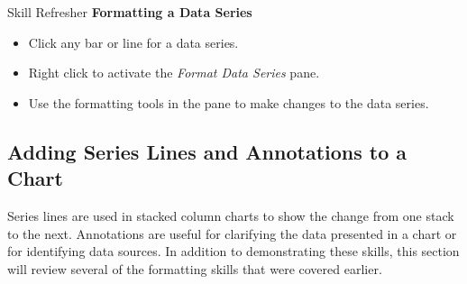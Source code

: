 \begin{center}
	\begin{sklbox}{Skill Refresher}
		\textbf{Formatting a Data Series}
		\\
		\begin{itemize}
			\setlength{\itemsep}{0pt}
			\setlength{\parskip}{0pt}
			\setlength{\parsep}{0pt}
			
			\item Click any bar or line for a data series.
			\item Right click to activate the \textit{Format Data Series} pane.
			\item Use the formatting tools in the pane to make changes to the data series.
			
		\end{itemize}
	\end{sklbox}
\end{center}

\subsection{Adding Series Lines and Annotations to a Chart}

Series lines are used in stacked column charts to show the change from one stack to the next. Annotations are useful for clarifying the data presented in a chart or for identifying data sources. In addition to demonstrating these skills, this section will review several of the formatting skills that were covered earlier. 

